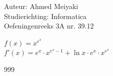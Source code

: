 \documentclass[a4paper]{article}
\begin{document}
  
\noindent \large Auteur: Ahmed Meiyaki \\
\noindent \large Studierichting: Informatica\\
\noindent \large Oefeningenreeks 3A nr. 39.12\\

\medskip

\normalsize

$f(x) = x^{e^x} $\\

$f'(x) = e^x \cdot x^{e^x-1} + \ln x \cdot e^x \cdot x^{e^x} $\\












\begin{thebibliography}{999}
\end{thebibliography}
\end{document}

